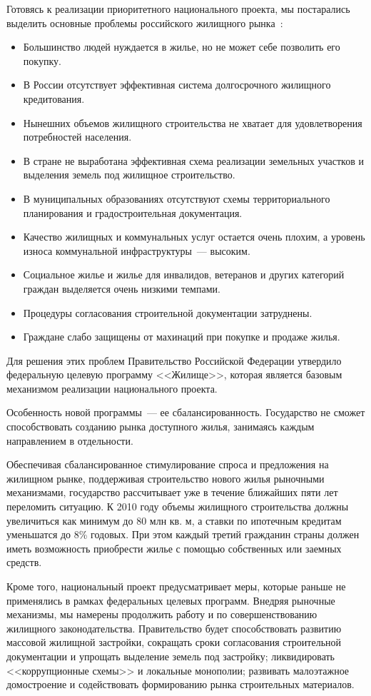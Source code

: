 \documentclass[article, 12pt, russian, oneside]{ncc}
\begin{document}
Готовясь к реализации приоритетного национального проекта, мы
постарались выделить основные проблемы российского жилищного
рынка~\cite{Hub_Problems}:

\begin{itemize}
\item Большинство людей нуждается в жилье, но не может себе позволить
  его покупку.
\item В России отсутствует эффективная система долгосрочного жилищного
  кредитования.
\item Нынешних объемов жилищного строительства не хватает для
  удовлетворения потребностей населения.
\item В стране не выработана эффективная схема реализации земельных
  участков и выделения земель под жилищное строительство.
\item В муниципальных образованиях отсутствуют схемы территориального
  планирования и градостроительная документация.
\item Качество жилищных и коммунальных услуг остается очень плохим, а
  уровень износа коммунальной инфраструктуры~--- высоким.
\item Социальное жилье и жилье для инвалидов, ветеранов и других
  категорий граждан выделяется очень низкими темпами.
\item Процедуры согласования строительной документации затруднены.
\item Граждане слабо защищены от махинаций при покупке и продаже
  жилья.
\end{itemize}

Для решения этих проблем Правительство Российской Федерации утвердило
федеральную целевую программу <<Жилище>>, которая является базовым
механизмом реализации национального проекта.

Особенность новой программы~--- ее сбалансированность. Государство не
сможет способствовать созданию рынка доступного жилья, занимаясь
каждым направлением в отдельности.

Обеспечивая сбалансированное стимулирование спроса и предложения на
жилищном рынке, поддерживая строительство нового жилья рыночными
механизмами, государство рассчитывает уже в течение ближайших пяти лет
переломить ситуацию. К 2010 году объемы жилищного строительства должны
увеличиться как минимум до 80 млн кв. м, а ставки по ипотечным
кредитам уменьшатся до 8\% годовых. При этом каждый третий гражданин
страны должен иметь возможность приобрести жилье с помощью собственных
или заемных средств.

Кроме того, национальный проект предусматривает меры, которые раньше
не применялись в рамках федеральных целевых программ. Внедряя рыночные
механизмы, мы намерены продолжить работу и по совершенствованию
жилищного законодательства. Правительство будет способствовать
развитию массовой жилищной застройки, сокращать сроки согласования
строительной документации и упрощать выделение земель под застройку;
ликвидировать <<коррупционные схемы>> и локальные монополии; развивать
малоэтажное домостроение и содействовать формированию рынка
строительных материалов.
\end{document}
